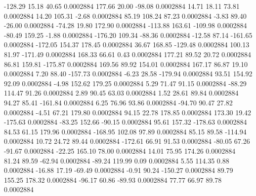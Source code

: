      -128.29       15.18       40.65     0.0002884
      177.66       20.00      -98.08     0.0002884
       14.71       18.11       73.81     0.0002884
       14.20      105.31       -2.68     0.0002884
       85.19      108.24       87.23     0.0002884
       -3.83       89.40      -26.00     0.0002884
      -74.28       19.80      172.90     0.0002884
     -113.88      163.61     -109.98     0.0002884
      -80.49      159.25       -1.88     0.0002884
     -176.20      109.34      -88.36     0.0002884
      -12.58       87.14     -161.65     0.0002884
     -172.05      154.37      178.45     0.0002884
       36.67      168.85     -129.48     0.0002884
      100.13       81.97     -171.49     0.0002884
      168.33       66.61        0.43     0.0002884
      177.21       89.52       20.72     0.0002884
       86.81      159.81     -175.87     0.0002884
      169.56       89.92      154.01     0.0002884
      167.17       86.87       19.10     0.0002884
        7.20       88.40     -157.73     0.0002884
       -6.23       28.58     -179.94     0.0002884
       93.51      154.92       92.09     0.0002884
       -4.98      152.62      179.25     0.0002884
        5.29       71.47       91.15     0.0002884
      -88.29      114.47       91.26     0.0002884
        2.89       90.45       63.03     0.0002884
        1.52       28.61       89.84     0.0002884
       94.27       85.41     -161.84     0.0002884
        6.25       76.96       93.86     0.0002884
      -94.70       90.47       27.82     0.0002884
       -4.51       67.21      179.80     0.0002884
       94.15       22.78      178.85     0.0002884
      173.30       19.42     -175.63     0.0002884
      -83.25      152.66      -90.15     0.0002884
       95.61      157.32     -178.63     0.0002884
       84.53       61.15      179.96     0.0002884
     -168.95      102.08       97.89     0.0002884
       85.15       89.58     -114.94     0.0002884
       10.72       24.72       89.44     0.0002884
     -172.61       66.91       91.53     0.0002884
      -80.05       67.26      -91.67     0.0002884
      -22.25      165.10       78.00     0.0002884
       14.01       75.95      174.26     0.0002884
       81.24       89.59      -62.94     0.0002884
      -89.24      119.99        0.09     0.0002884
        5.55      114.35        0.88     0.0002884
      -16.88       17.19      -69.49     0.0002884
       -0.91       90.24     -150.27     0.0002884
       89.79      155.25      178.32     0.0002884
      -96.17       60.86      -89.93     0.0002884
       77.77       66.97       89.78     0.0002884
